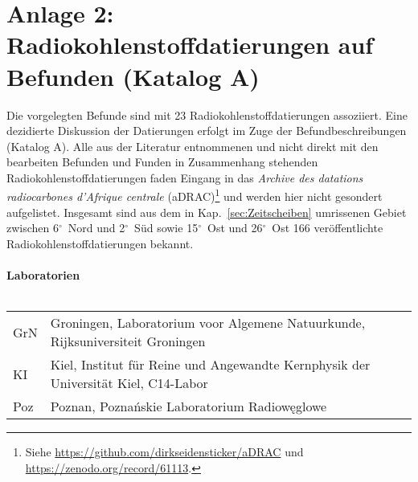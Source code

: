 \section*{Anlage 2: Radiokohlenstoffdatierungen auf Befunden (Katalog A)}

Die vorgelegten Befunde sind mit 23 Radiokohlenstoffdatierungen assoziiert. Eine dezidierte Diskussion der Datierungen erfolgt im Zuge der Befundbeschreibungen (Katalog A). Alle aus der Literatur entnommenen und nicht direkt mit den bearbeiten Befunden und Funden in Zusammenhang stehenden Radiokohlenstoffdatierungen faden Eingang in das \textit{Archive des datations radiocarbones d’Afrique centrale} (aDRAC)\footnote{Siehe \url{https://github.com/dirkseidensticker/aDRAC} und \url{https://zenodo.org/record/61113}.} und werden hier nicht gesondert aufgelistet. Insgesamt sind aus dem in Kap.~\ref{sec:Zeitscheiben} umrissenen Gebiet zwischen 6$^\circ$~Nord und 2$^\circ$~Süd sowie 15$^\circ$~Ost und 26$^\circ$~Ost 166 veröffentlichte Radiokohlenstoffdatierungen bekannt.

\paragraph*{Laboratorien}
$\;$ \\

\vspace{.75em}
\begin{tabular}{@{}p{}p{}@{}}
GrN & Groningen, Laboratorium voor Algemene Natuurkunde, Rijksuniversiteit Groningen \\ 
KI & Kiel, Institut für Reine und Angewandte Kernphysik der Universität Kiel, C14-Labor \\ 
Poz & Poznan, Poznańskie Laboratorium Radiowęglowe \\ 
\end{tabular}

\vspace{.75em}

\clearpage